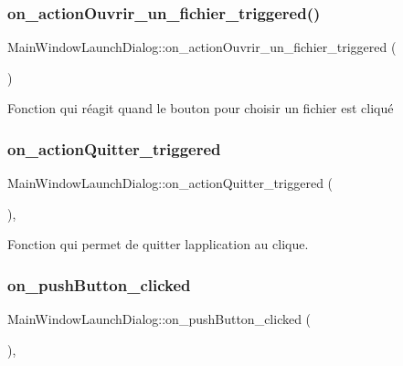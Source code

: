 \subsubsection{\texorpdfstring{on\+\_\+action\+Ouvrir\+\_\+un\+\_\+fichier\+\_\+triggered()}{on\_actionOuvrir\_un\_fichier\_triggered()}}
{\footnotesize\ttfamily Main\+Window\+Launch\+Dialog\+::on\+\_\+action\+Ouvrir\+\_\+un\+\_\+fichier\+\_\+triggered (\begin{DoxyParamCaption}{ }\end{DoxyParamCaption})}



Fonction qui réagit quand le bouton pour choisir un fichier est cliqué 

\mbox{\label{classMainWindowLaunchDialog_aad807a24560cbcb3d864a1c6b678537e}} 
\subsubsection{\texorpdfstring{on\+\_\+action\+Quitter\+\_\+triggered}{on\_actionQuitter\_triggered}}
{\footnotesize\ttfamily Main\+Window\+Launch\+Dialog\+::on\+\_\+action\+Quitter\+\_\+triggered (\begin{DoxyParamCaption}{ }\end{DoxyParamCaption})\hspace{0.3cm}{\ttfamily [private]}, {\ttfamily [slot]}}



Fonction qui permet de quitter l\textquotesingle{}application au clique. 

\mbox{\label{classMainWindowLaunchDialog_a4464510ed5080984f0af0d3c0559f9eb}} 
\subsubsection{\texorpdfstring{on\+\_\+push\+Button\+\_\+clicked}{on\_pushButton\_clicked}}
{\footnotesize\ttfamily Main\+Window\+Launch\+Dialog\+::on\+\_\+push\+Button\+\_\+clicked (\begin{DoxyParamCaption}{ }\end{DoxyParamCaption})\hspace{0.3cm}{\ttfamily [private]}, {\ttfamily [slot]}}



